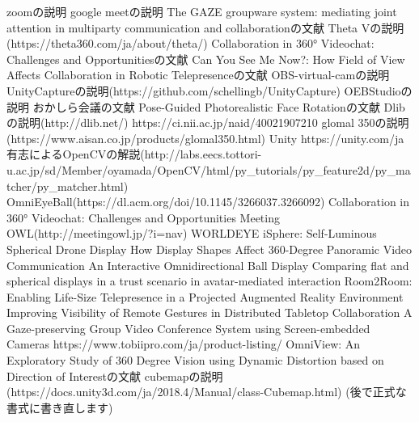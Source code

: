 
zoomの説明
google meetの説明
The GAZE groupware system: mediating joint attention in multiparty communication and collaborationの文献
Theta Vの説明(https://theta360.com/ja/about/theta/)
Collaboration in 360° Videochat: Challenges and Opportunitiesの文献
Can You See Me Now?: How Field of View Affects Collaboration in Robotic Telepresenceの文献
OBS-virtual-camの説明
UnityCaptureの説明(https://github.com/schellingb/UnityCapture)
OEBStudioの説明
おかしら会議の文献
Pose-Guided Photorealistic Face Rotationの文献
Dlibの説明(http://dlib.net/)
https://ci.nii.ac.jp/naid/40021907210
glomal 350の説明(https://www.aisan.co.jp/products/glomal350.html)
Unity https://unity.com/ja
有志によるOpenCVの解説(http://labs.eecs.tottori-u.ac.jp/sd/Member/oyamada/OpenCV/html/py\_tutorials/py\_feature2d/py\_matcher/py\_matcher.html)
OmniEyeBall(https://dl.acm.org/doi/10.1145/3266037.3266092)
Collaboration in 360° Videochat: Challenges and Opportunities
Meeting OWL(http://meetingowl.jp/?i=nav)
WORLDEYE
iSphere: Self-Luminous Spherical Drone Display
How Display Shapes Affect 360-Degree Panoramic Video Communication
An Interactive Omnidirectional Ball Display
Comparing flat and spherical displays in a trust scenario in avatar-mediated interaction
Room2Room: Enabling Life-Size Telepresence in a Projected Augmented Reality Environment
Improving Visibility of Remote Gestures in Distributed Tabletop Collaboration
A Gaze-preserving Group Video Conference System using Screen-embedded Cameras
https://www.tobiipro.com/ja/product-listing/
OmniView: An Exploratory Study of 360 Degree Vision using Dynamic Distortion based on Direction of Interestの文献
cubemapの説明(https://docs.unity3d.com/ja/2018.4/Manual/class-Cubemap.html)
(後で正式な書式に書き直します)
